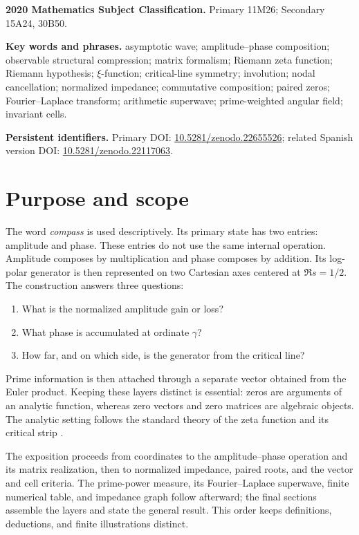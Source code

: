 \documentclass[11pt]{article}
\begin{document}
\begin{center}
\begin{minipage}{0.94\linewidth}
\footnotesize
\textbf{2020 Mathematics Subject Classification.}
Primary 11M26; Secondary 15A24, 30B50.\par
\smallskip
\textbf{Key words and phrases.}
asymptotic wave; amplitude--phase composition; observable structural compression;
matrix formalism; Riemann zeta function; Riemann hypothesis; $\xi$-function;
critical-line symmetry; involution; nodal cancellation; normalized impedance;
commutative composition; paired zeros; Fourier--Laplace transform; arithmetic superwave;
prime-weighted angular field; invariant cells.\par
\smallskip
\textbf{Persistent identifiers.}
Primary DOI:
\href{https://doi.org/10.5281/zenodo.22655526}{10.5281/zenodo.22655526};
related Spanish version DOI:
\href{https://doi.org/10.5281/zenodo.22117063}{10.5281/zenodo.22117063}.
\end{minipage}
\end{center}

\section{Purpose and scope}
The word \emph{compass} is used descriptively.  Its primary state has two entries: amplitude
and phase.  These entries do not use the same internal operation.  Amplitude composes by
multiplication and phase composes by addition.  Its log-polar generator is then represented on
two Cartesian axes centered at $\Re s=1/2$.  The construction answers three questions:
\begin{enumerate}
 \item What is the normalized amplitude gain or loss?
 \item What phase is accumulated at ordinate $\gamma$?
 \item How far, and on which side, is the generator from the critical line?
\end{enumerate}
Prime information is then attached through a separate vector obtained from the Euler product.
Keeping these layers distinct is essential: zeros are arguments of an analytic function,
whereas zero vectors and zero matrices are algebraic objects.  The analytic setting follows the
standard theory of the zeta function and its critical strip
\cite{Riemann,Titchmarsh,Bombieri,DLMFzeros}.

The exposition proceeds from coordinates to the amplitude--phase operation and its matrix
realization, then to normalized impedance, paired roots, and the vector and cell criteria.  The
prime-power measure, its Fourier--Laplace superwave, finite numerical table, and impedance graph
follow afterward; the final sections assemble the layers and state the general result.  This
order keeps definitions, deductions, and finite illustrations distinct.
\end{document}

